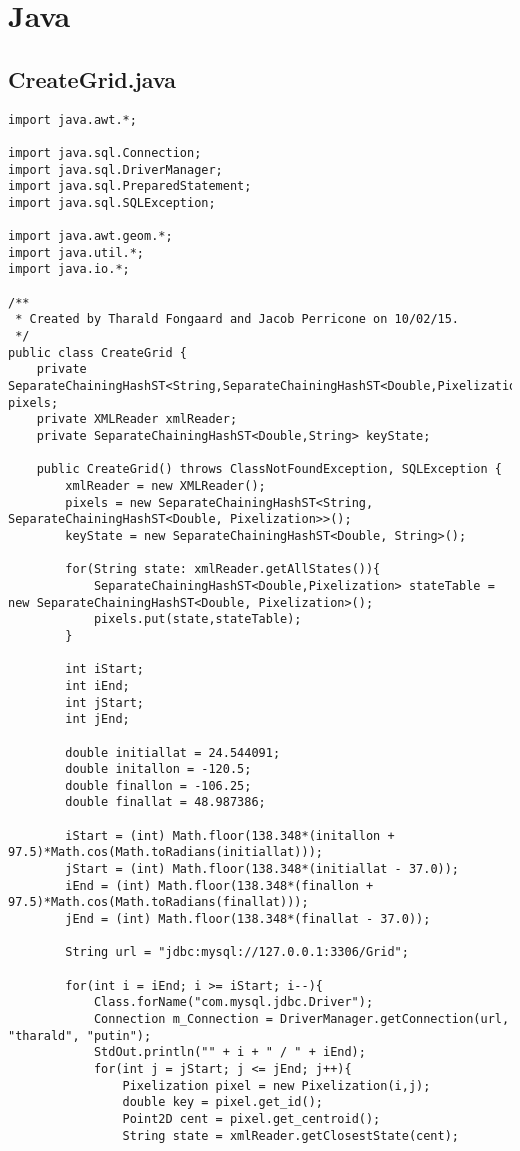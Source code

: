 \section{Java}
\subsection{CreateGrid.java}
\begin{verbatim}
import java.awt.*;

import java.sql.Connection;
import java.sql.DriverManager;
import java.sql.PreparedStatement;
import java.sql.SQLException;

import java.awt.geom.*;
import java.util.*;
import java.io.*;

/**
 * Created by Tharald Fongaard and Jacob Perricone on 10/02/15.
 */
public class CreateGrid {
    private SeparateChainingHashST<String,SeparateChainingHashST<Double,Pixelization>> pixels;
    private XMLReader xmlReader;
    private SeparateChainingHashST<Double,String> keyState;

    public CreateGrid() throws ClassNotFoundException, SQLException {
        xmlReader = new XMLReader();
        pixels = new SeparateChainingHashST<String, SeparateChainingHashST<Double, Pixelization>>();
        keyState = new SeparateChainingHashST<Double, String>();

        for(String state: xmlReader.getAllStates()){
            SeparateChainingHashST<Double,Pixelization> stateTable = new SeparateChainingHashST<Double, Pixelization>();
            pixels.put(state,stateTable);
        }

        int iStart;
        int iEnd;
        int jStart;
        int jEnd;

        double initiallat = 24.544091;
        double initallon = -120.5;
        double finallon = -106.25;
        double finallat = 48.987386;

        iStart = (int) Math.floor(138.348*(initallon + 97.5)*Math.cos(Math.toRadians(initiallat)));
        jStart = (int) Math.floor(138.348*(initiallat - 37.0));
        iEnd = (int) Math.floor(138.348*(finallon + 97.5)*Math.cos(Math.toRadians(finallat)));
        jEnd = (int) Math.floor(138.348*(finallat - 37.0));

        String url = "jdbc:mysql://127.0.0.1:3306/Grid";

        for(int i = iEnd; i >= iStart; i--){
            Class.forName("com.mysql.jdbc.Driver");
            Connection m_Connection = DriverManager.getConnection(url, "tharald", "putin");
            StdOut.println("" + i + " / " + iEnd);
            for(int j = jStart; j <= jEnd; j++){
                Pixelization pixel = new Pixelization(i,j);
                double key = pixel.get_id();
                Point2D cent = pixel.get_centroid();
                String state = xmlReader.getClosestState(cent);


\end{verbatim}

